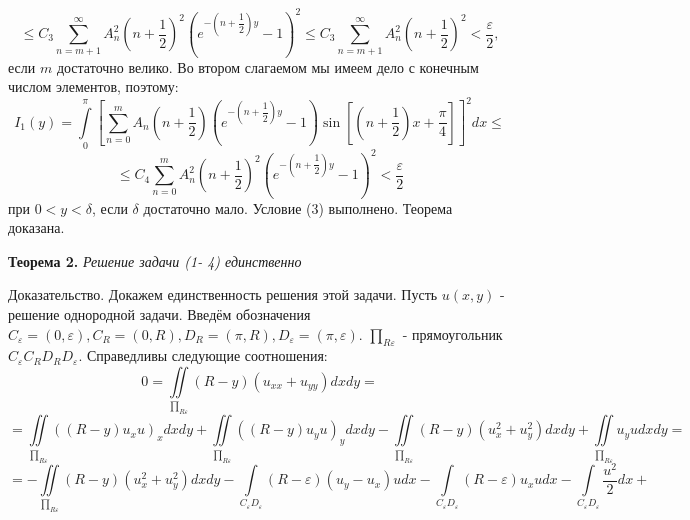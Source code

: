 \documentclass[a4paper, 9pt]{article}
\begin{document}
	\begin{equation*}
		\leq  C_3 \sum\limits_{n=m+1}^{\infty} A_n^2 \left(n+\dfrac12\right)^2 \left(e^{-\left(n+\dfrac12\right)y} - 1\right)^2 \leq C_3 \sum\limits_{n=m+1}^{\infty} A_n^2 \left(n+\dfrac12\right)^2 < \dfrac{\varepsilon}{2},
	\end{equation*}
	если  $m$ достаточно велико.\newline
	Во втором слагаемом мы имеем дело с конечным числом элементов, поэтому:
	\begin{equation*}
		I_1(y) = \int\limits_0^\pi \left[	\sum\limits_{n=0}^{m} A_n\left(n+\dfrac12\right) \left( e^{-\left(n+\dfrac12\right)y} - 1\right) \sin{\left[\left(n+\dfrac12\right) x  + \dfrac\pi4\right]} \right]^2 dx \leq
	\end{equation*}
	\begin{equation*}
		\leq C_4 \sum\limits_{n=0}^{m} A_n^2 \left(n +\dfrac12\right)^2 \left(e^{-\left(n+\dfrac12\right)y} - 1\right)^2 < \dfrac{\varepsilon}{2}
	\end{equation*}
	при $0 < y < \delta$, если $\delta$ достаточно мало. Условие (3) выполнено. Теорема доказана.
	\par
		\textbf{Теорема 2.} \textit{Решение задачи (1- 4) единственно}
	\par
		Доказательство. Докажем единственность решения этой задачи. Пусть $u(x,y)$ - решение однородной задачи.
		Введём обозначения $C_\varepsilon = (0, \varepsilon), C_R = (0, R), D_R = (\pi, R), D_\varepsilon = (\pi, \varepsilon)$. $\prod_{R\varepsilon}$ - прямоугольник $C_\varepsilon C_R D_R D_\varepsilon$. Справедливы следующие соотношения:
		\begin{equation*}
			0 = \iint\limits_{\prod_{R\varepsilon}} (R-y) (u_{xx} + u_{yy}) dx dy = 
		\end{equation*}
		\begin{equation*}
			=	\iint\limits_{\prod_{R\varepsilon}} \left( \left(R - y\right) u_x u\right)_x dx dy  + \iint\limits_{\prod_{R\varepsilon}} \left( \left(R - y\right) u_y u\right)_y dx dy  
			- \iint\limits_{\prod_{R\varepsilon}} \left(R- y\right) \left(u_x^2 + u_y^2\right)dxdy + \iint\limits_{\prod_{R\varepsilon}} u_y u dx dy = 
		\end{equation*}
		\begin{equation*}
			= - \iint\limits_{\prod_{R\varepsilon}} \left(R - y\right) \left(u_x^2 + u_y^2\right) dx dy - 
			\int\limits_{C_\varepsilon D_\varepsilon} \left(R - \varepsilon \right) \left(u_y - u_x\right)u dx - \int\limits_{C_\varepsilon D_\varepsilon} \left(R - \varepsilon\right) u_x u dx - \int\limits_{C_\varepsilon D_\varepsilon}\dfrac{u^2}{2} dx +
		\end{equation*}
\end{document}
